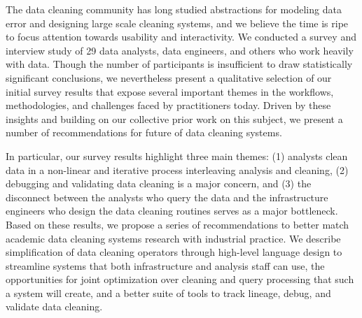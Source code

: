 The data cleaning community has long studied abstractions for modeling data error and designing large scale cleaning systems, and we believe the time is ripe to focus attention towards usability and interactivity.
We conducted a survey and interview study of 29 data analysts, data engineers, and others who work heavily with data.
Though the number of participants is insufficient to draw statistically significant conclusions, we nevertheless present a qualitative selection of our initial survey results that expose several important themes in the workflows, methodologies, and challenges faced by practitioners today.
Driven by these insights and building on our collective prior work on this subject, we present a number of recommendations for future of data cleaning systems.

In particular, our survey results highlight three main themes: (1) analysts clean data in a non-linear and iterative process interleaving analysis and cleaning, (2) debugging and validating data cleaning is a major concern, and (3) the disconnect between the analysts who query the data and the infrastructure engineers who design the data cleaning routines serves as a major bottleneck.
Based on these results, we propose a series of recommendations to better match academic data cleaning systems research with industrial practice.
We describe simplification of data cleaning operators through high-level language design to streamline systems that both infrastructure and analysis staff can use, the opportunities for joint optimization over cleaning and query processing that such a system will create, and a better suite of tools to track lineage, debug, and validate data cleaning. 


\iffalse
In summary, the paper is organized as follows:
\begin{itemize}
\item In Section~\ref{sec:relwork} we discuss related work in interactive data cleaning.
\item In Section~\ref{sec:survey} we present initial results from a survey of N=29 industry users of data analysis software that highlights the strengths and limitations of existing data cleaning workflows.
\item In Section~\ref{sec:themes} we provide a qualitative analysis of the survey results that highlights 3 key themes of modern data cleaning.
\item In Section~\ref{sec:future} we propose future research that addresses these themes within a unified framework for interactive data cleaning. 
\end{itemize}
\fi

